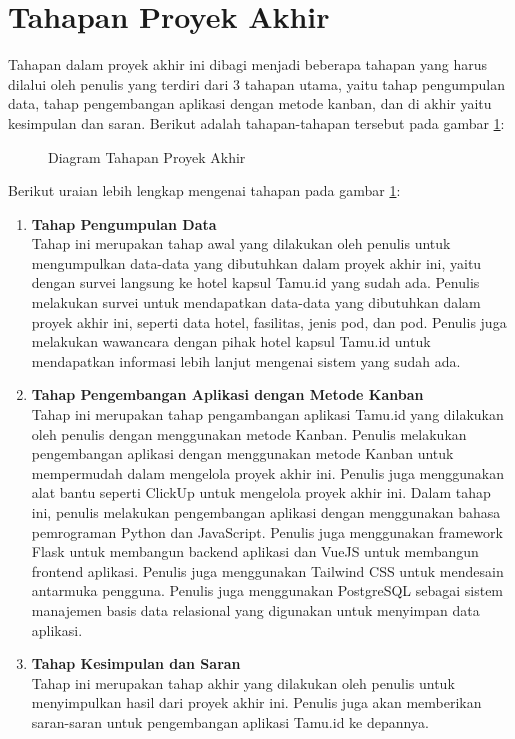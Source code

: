 \section{Tahapan Proyek Akhir}

Tahapan dalam proyek akhir ini dibagi menjadi beberapa tahapan yang harus dilalui oleh penulis yang terdiri dari 3 tahapan utama, yaitu tahap pengumpulan data, tahap pengembangan aplikasi dengan metode kanban, dan di akhir yaitu kesimpulan dan saran. Berikut adalah tahapan-tahapan tersebut pada gambar \ref{fig:tahapan_proyek}:

\begin{figure}[H] %
    \centering
    \caption{Diagram Tahapan Proyek Akhir}
    \label{fig:tahapan_proyek} %
\end{figure}

Berikut uraian lebih lengkap mengenai tahapan pada gambar \ref{fig:tahapan_proyek}:

\begin{enumerate}
    \item \textbf{Tahap Pengumpulan Data} \\
          Tahap ini merupakan tahap awal yang dilakukan oleh penulis untuk mengumpulkan data-data yang dibutuhkan dalam proyek akhir ini, yaitu dengan survei langsung ke hotel kapsul Tamu.id yang sudah ada. Penulis melakukan survei untuk mendapatkan data-data yang dibutuhkan dalam proyek akhir ini, seperti data hotel, fasilitas, jenis pod, dan pod. Penulis juga melakukan wawancara dengan pihak hotel kapsul Tamu.id untuk mendapatkan informasi lebih lanjut mengenai sistem yang sudah ada.

    \item \textbf{Tahap Pengembangan Aplikasi dengan Metode Kanban} \\
          Tahap ini merupakan tahap pengambangan aplikasi Tamu.id yang dilakukan oleh penulis dengan menggunakan metode Kanban. Penulis melakukan pengembangan aplikasi dengan menggunakan metode Kanban untuk mempermudah dalam mengelola proyek akhir ini. Penulis juga menggunakan alat bantu seperti ClickUp untuk mengelola proyek akhir ini. Dalam tahap ini, penulis melakukan pengembangan aplikasi dengan menggunakan bahasa pemrograman Python dan JavaScript. Penulis juga menggunakan framework Flask untuk membangun backend aplikasi dan VueJS untuk membangun frontend aplikasi. Penulis juga menggunakan Tailwind CSS untuk mendesain antarmuka pengguna. Penulis juga menggunakan PostgreSQL sebagai sistem manajemen basis data relasional yang digunakan untuk menyimpan data aplikasi.

    \item \textbf{Tahap Kesimpulan dan Saran} \\
          Tahap ini merupakan tahap akhir yang dilakukan oleh penulis untuk menyimpulkan hasil dari proyek akhir ini. Penulis juga akan memberikan saran-saran untuk pengembangan aplikasi Tamu.id ke depannya.
\end{enumerate}